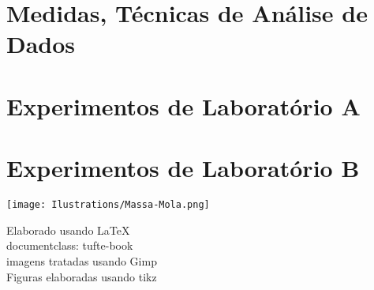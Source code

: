 \documentclass[justified,a4paper,symmetric,nobib]{tufte-book}
\title{}
\author{Clebson Abati Graeff}
\title[Notas de aula de laboratório]{%
  Notas de aula: \\ Laboratórios de Física A e B. \par \vfill
  \hfill\usebox{\titleimage}}
\begin{document}
\frontmatter
\pagestyle{empty}



\mainmatter
\pagestyle{fancy}

\part{Medidas, Técnicas de Análise de Dados}







\part{Experimentos de Laboratório A}
 















\part{Experimentos de Laboratório B}











\printbibliography
\cleardoublepage
\thispagestyle{empty}
\begin{figure*}
\centering
\texttt{[image: Ilustrations/Massa-Mola.png]}
\end{figure*}
\vfill
\begin{fullwidth}
\begin{center}\sc
Elaborado usando \LaTeX \\
documentclass: tufte-book \\
imagens tratadas usando Gimp \\
Figuras elaboradas usando tikz
\end{center}
\end{fullwidth}
\end{document}
